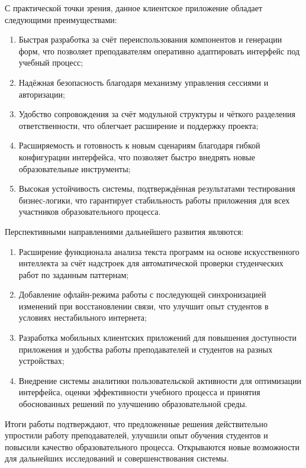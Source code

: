 С практической точки зрения, данное клиентское приложение обладает следующими преимуществами:
\begin{enumerate}
  \item Быстрая разработка за счёт переиспользования компонентов и генерации форм, что позволяет преподавателям оперативно адаптировать интерфейс под учебный процесс;
  \item Надёжная безопасность благодаря механизму управления сессиями и авторизации;
  \item Удобство сопровождения за счёт модульной структуры и чёткого разделения ответственности, что облегчает расширение и поддержку проекта;
  \item Расширяемость и готовность к новым сценариям благодаря гибкой конфигурации интерфейса, что позволяет быстро внедрять новые образовательные инструменты;
  \item Высокая устойчивость системы, подтверждённая результатами тестирования бизнес-логики, что гарантирует стабильность работы приложения для всех участников образовательного процесса.
\end{enumerate}

Перспективными направлениями дальнейшего развития являются:
\begin{enumerate}
  \item Расширение функционала анализа текста программ на основе искусственного интеллекта за счёт надстроек для автоматической проверки студенческих работ по заданным паттернам;
  \item Добавление офлайн-режима работы с последующей синхронизацией изменений при восстановлении связи, что улучшит опыт студентов в условиях нестабильного интернета;
  \item Разработка мобильных клиентских приложений для повышения доступности приложения и удобства работы преподавателей и студентов на разных устройствах;
  \item Внедрение системы аналитики пользовательской активности для оптимизации интерфейса, оценки эффективности учебного процесса и принятия обоснованных решений по улучшению образовательной среды.
\end{enumerate}

Итоги работы подтверждают, что предложенные решения действительно упростили работу преподавателей, улучшили опыт обучения студентов и повысили качество образовательного процесса. Открываются новые возможности для дальнейших исследований и совершенствования системы.
